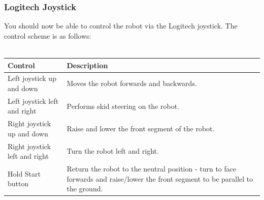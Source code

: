 \documentclass[]{article}
\begin{document}
\subsubsection{Logitech Joystick}
You should now be able to control the robot via the Logitech joystick. The control scheme is as follows:
\\
\\
\begin{tabular}{ | l | p{7cm} | }
\hline
\textbf{Control} & \textbf{Description} \\ \hline
Left joystick up and down & Moves the robot forwards and backwards. \\ \hline
Left joystick left and right & Performs skid steering on the robot. \\ \hline
Right joystick up and down & Raise and lower the front segment of the robot. \\ \hline
Right joystick left and right & Turn the robot left and right. \\ \hline
Hold Start button & Return the robot to the neutral position - turn to face forwards and raise/lower the front segment to be parallel to the ground. \\ \hline
\end{tabular}
\end{document}
